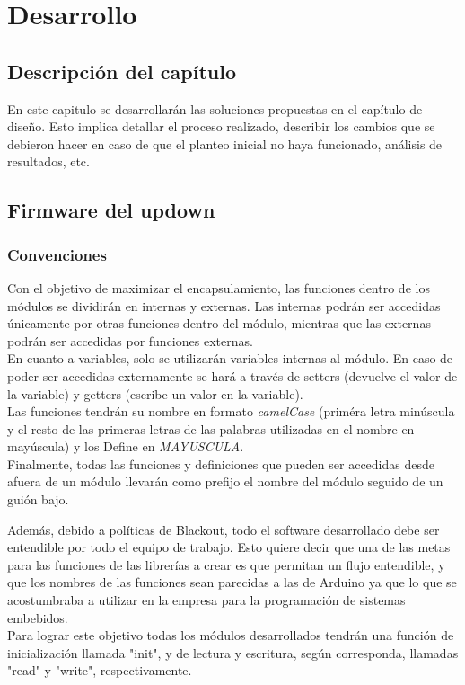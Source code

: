 \chapter{Desarrollo}
\thispagestyle{empty}

\section{Descripción del capítulo} \label{sec:\thesection}
En este capitulo se desarrollarán las soluciones propuestas en el capítulo de diseño. Esto implica detallar el proceso realizado, describir los cambios que se debieron hacer en caso de que el planteo inicial no haya funcionado, análisis de resultados, etc.

\section{Firmware del updown} \label{sec:\thesection}
\subsection{Convenciones}
Con el objetivo de maximizar el encapsulamiento, las funciones dentro de los módulos se dividirán en internas y externas. Las internas podrán ser accedidas únicamente por otras funciones dentro del módulo, mientras que las externas podrán ser accedidas por funciones externas.\\
En cuanto a variables, solo se utilizarán variables internas al módulo. En caso de poder ser accedidas externamente se hará a través de setters (devuelve el valor de la variable) y getters (escribe un valor en la variable).\\
Las funciones tendrán su nombre en formato \textit{camelCase} (priméra letra minúscula y el resto de las primeras letras de las palabras utilizadas en el nombre en mayúscula) y los Define en \textit{MAYUSCULA}.\\
Finalmente, todas las funciones y definiciones que pueden ser accedidas desde afuera de un módulo llevarán como prefijo el nombre del módulo seguido de un guión bajo. 

Además, debido a políticas de Blackout, todo el software desarrollado debe ser entendible por todo el equipo de trabajo. Esto quiere decir que una de las metas para las funciones de las librerías a crear es que permitan un flujo entendible, y que los nombres de las funciones sean parecidas a las de Arduino ya que lo que se acostumbraba a utilizar en la empresa para la programación de sistemas embebidos.\\
Para lograr este objetivo todas los módulos desarrollados tendrán una función de inicialización llamada "init", y de lectura y escritura, según corresponda, llamadas "read" y "write", respectivamente.

